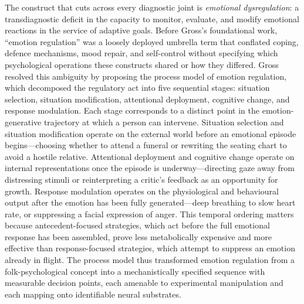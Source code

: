 The construct that cuts across every diagnostic joint is \emph{emotional
dysregulation}: a transdiagnostic deficit in the capacity to monitor,
evaluate, and modify emotional reactions in the service of adaptive goals.
Before Gross's foundational work, ``emotion regulation'' was a loosely
deployed umbrella term that conflated coping, defence mechanisms, mood
repair, and self-control without specifying which psychological operations
these constructs shared or how they differed.  Gross resolved this
ambiguity by proposing the process model of emotion regulation, which
decomposed the regulatory act into five sequential stages: situation
selection, situation modification, attentional deployment, cognitive
change, and response modulation.  Each stage corresponds to a
distinct point in the emotion-generative trajectory at which a person can
intervene.  Situation selection and situation modification operate on the
external world before an emotional episode begins---choosing whether to
attend a funeral or rewriting the seating chart to avoid a hostile
relative.  Attentional deployment and cognitive change operate on internal
representations once the episode is underway---directing gaze away from
distressing stimuli or reinterpreting a critic's feedback as an
opportunity for growth.  Response modulation operates on the physiological
and behavioural output after the emotion has been fully generated---deep
breathing to slow heart rate, or suppressing a facial expression of anger.
This temporal ordering matters because antecedent-focused strategies, which
act before the full emotional response has been assembled, prove less
metabolically expensive and more effective than response-focused
strategies, which attempt to suppress an emotion already in flight.
The process model thus transformed emotion regulation from a
folk-psychological concept into a mechanistically specified sequence with
measurable decision points, each amenable to experimental manipulation and
each mapping onto identifiable neural substrates.

